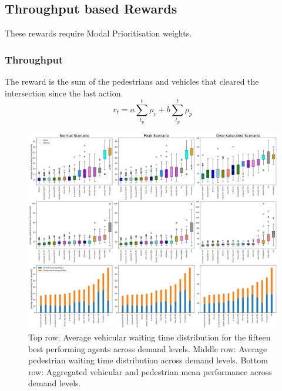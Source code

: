 \documentclass[sigconf,anonymous]{aamas}
\begin{document}
\subsection{Throughput based Rewards}
These rewards require Modal Prioritisation weights.
\subsubsection{Throughput}
The reward is the sum of the pedestrians and vehicles that cleared the intersection since the last action.
\begin{equation}
    r_t = a \sum_{t_p}^t \rho_v + b \sum_{t_p}^t \rho_p
\label{eq:throughput}
\end{equation}
\begin{figure}                                                
\centering                                                    
\includegraphics[width=\textwidth]{9grid_ordered_boxplot_all.png}                                    
\caption{Top row: Average vehicular waiting time distribution for the fifteen best performing agents across demand levels. Middle row: Average pedestrian waiting time distribution across demand levels. Bottom row: Aggregated vehicular and pedestrian mean performance across demand levels.}                                  
\label{fig:results_9_grid}                                               
\end{figure}
\end{document}
